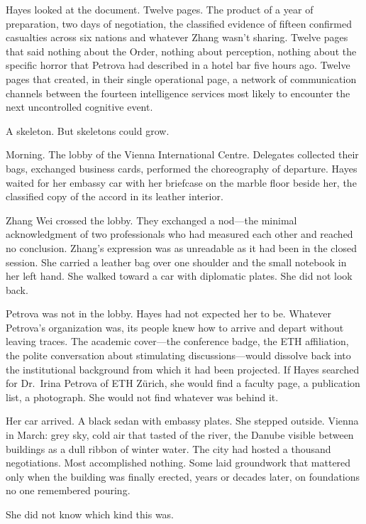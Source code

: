 Hayes looked at the document. Twelve pages. The product of a year of preparation, two days of negotiation, the classified evidence of fifteen confirmed casualties across six nations and whatever Zhang wasn't sharing. Twelve pages that said nothing about the Order, nothing about perception, nothing about the specific horror that Petrova had described in a hotel bar five hours ago. Twelve pages that created, in their single operational page, a network of communication channels between the fourteen intelligence services most likely to encounter the next uncontrolled cognitive event.

A skeleton. But skeletons could grow.

\scenebreak

Morning. The lobby of the Vienna International Centre. Delegates collected their bags, exchanged business cards, performed the choreography of departure. Hayes waited for her embassy car with her briefcase on the marble floor beside her, the classified copy of the accord in its leather interior.

Zhang Wei crossed the lobby. They exchanged a nod---the minimal acknowledgment of two professionals who had measured each other and reached no conclusion. Zhang's expression was as unreadable as it had been in the closed session. She carried a leather bag over one shoulder and the small notebook in her left hand. She walked toward a car with diplomatic plates. She did not look back.

Petrova was not in the lobby. Hayes had not expected her to be. Whatever Petrova's organization was, its people knew how to arrive and depart without leaving traces. The academic cover---the conference badge, the ETH affiliation, the polite conversation about stimulating discussions---would dissolve back into the institutional background from which it had been projected. If Hayes searched for Dr.\ Irina Petrova of ETH Z\"urich, she would find a faculty page, a publication list, a photograph. She would not find whatever was behind it.

Her car arrived. A black sedan with embassy plates. She stepped outside. Vienna in March: grey sky, cold air that tasted of the river, the Danube visible between buildings as a dull ribbon of winter water. The city had hosted a thousand negotiations. Most accomplished nothing. Some laid groundwork that mattered only when the building was finally erected, years or decades later, on foundations no one remembered pouring.

She did not know which kind this was.

